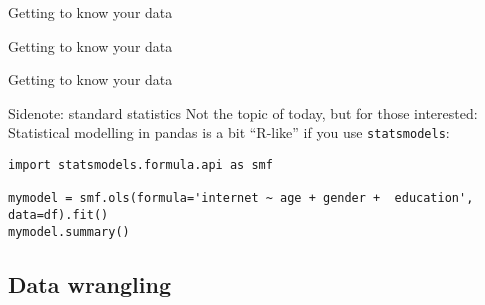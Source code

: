 \begin{frame}[fragile]{Getting to know your data}
\end{frame}


\begin{frame}[fragile]{Getting to know your data}
\end{frame}


\begin{frame}[fragile]{Getting to know your data}
\end{frame}






\begin{frame}[fragile]{Sidenote: standard statistics}
Not the topic of today, but for those interested: Statistical modelling in pandas is a bit ``R-like'' if you use \texttt{statsmodels}:

\begin{verbatim}
import statsmodels.formula.api as smf

mymodel = smf.ols(formula='internet ~ age + gender +  education', data=df).fit()
mymodel.summary()
\end{verbatim}    



\end{frame}
























\subsection{Data wrangling}




